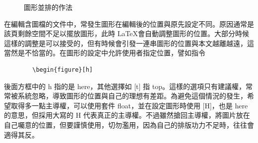 \begin{figure}[H]
    \centering
    \caption{圖形並排的作法}
    \label{fig:parallel}
\end{figure}

在編輯含圖檔的文件中，常發生圖形在編輯後的位置與原先設定不同。原因通常是該頁剩餘空間不足以擺放圖形，此時 \LaTeX 會自動調整圖形的位置。大部分時候這樣的調整是可以接受的，但有時候會引發一連串圖形的位置與本文越離越遠，這當然是不恰當的。在圖形的設定中允許使用者指定位置，譬如指令

\bigskip
	\begin{lstlisting}
		\begin{figure}[h]
	\end{lstlisting}
\bigskip
後面方框中的 h 指的是 here，其他選擇如  [t] 指 top。這樣的選項只有建議權，常常被系統忽略，導致圖形的位置與自己的理想有差距。為避免這個情況的發生，希望取得多一點主導權，可以使用套件 float，並在設定圖形時使用  [H]，也是 here 的意思，但採用大寫的  H 代表真正的主導權。不過雖然搶回主導權，將圖片放在自己囑意的位置，但要謹慎使用，切勿濫用，因為自己的排版功力不足時，往往會適得其反。



%
